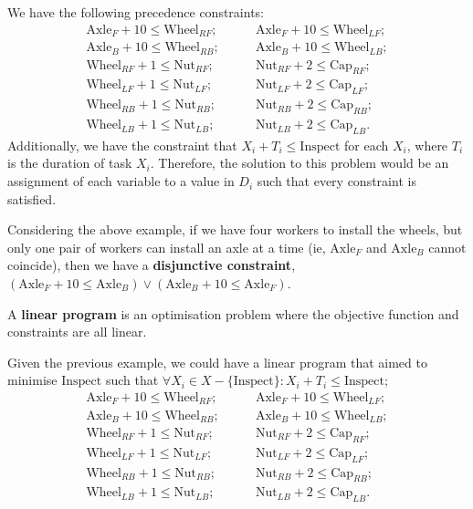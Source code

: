 \begin{example}
    We have the following precedence constraints:\\
    \begin{align*}
        \text{Axle}_{F} + 10 \le \text{Wheel}_{RF}; &\qquad \text{Axle}_{F} + 10 \le \text{Wheel}_{LF};\\
        \text{Axle}_{B} + 10 \le \text{Wheel}_{RB}; &\qquad \text{Axle}_{B} + 10 \le \text{Wheel}_{LB};\\
        \text{Wheel}_{RF} + 1 \le \text{Nut}_{RF}; &\qquad \text{Nut}_{RF} + 2 \le \text{Cap}_{RF};\\
        \text{Wheel}_{LF} + 1 \le \text{Nut}_{LF}; &\qquad \text{Nut}_{LF} + 2 \le \text{Cap}_{LF};\\
        \text{Wheel}_{RB} + 1 \le \text{Nut}_{RB}; &\qquad \text{Nut}_{RB} + 2 \le \text{Cap}_{RB};\\
        \text{Wheel}_{LB} + 1 \le \text{Nut}_{LB}; &\qquad \text{Nut}_{LB} + 2 \le \text{Cap}_{LB}.
    \end{align*}
    Additionally, we have the constraint that $X_{i} + T_{i} \le \text{Inspect}$ for each $X_{i}$, where $T_{i}$ is the duration of task $X_{i}$. Therefore, the solution to this problem would be an assignment of each variable to a value in $D_{i}$ such that every constraint is satisfied.
\end{example}

Considering the above example, if we have four workers to install the wheels, but only one pair of workers can install an axle at a time (ie, $\text{Axle}_{F}$ and $\text{Axle}_{B}$ cannot coincide), then we have a \textbf{disjunctive constraint}, $(\text{Axle}_{F} + 10 \le \text{Axle}_{B}) \lor (\text{Axle}_{B} + 10 \le \text{Axle}_{F})$.

\begin{definition}
    A \textbf{linear program} is an optimisation problem where the objective function and constraints are all linear.
\end{definition}

\begin{example}
    Given the previous example, we could have a linear program that aimed to minimise $\text{Inspect}$ such that $\forall X_{i} \in X - \{ \text{Inspect} \} : X_{i} + T_{i} \le \text{Inspect}$;
    \begin{align*}
        \text{Axle}_{F} + 10 \le \text{Wheel}_{RF}; &\qquad \text{Axle}_{F} + 10 \le \text{Wheel}_{LF};\\
        \text{Axle}_{B} + 10 \le \text{Wheel}_{RB}; &\qquad \text{Axle}_{B} + 10 \le \text{Wheel}_{LB};\\
        \text{Wheel}_{RF} + 1 \le \text{Nut}_{RF}; &\qquad \text{Nut}_{RF} + 2 \le \text{Cap}_{RF};\\
        \text{Wheel}_{LF} + 1 \le \text{Nut}_{LF}; &\qquad \text{Nut}_{LF} + 2 \le \text{Cap}_{LF};\\
        \text{Wheel}_{RB} + 1 \le \text{Nut}_{RB}; &\qquad \text{Nut}_{RB} + 2 \le \text{Cap}_{RB};\\
        \text{Wheel}_{LB} + 1 \le \text{Nut}_{LB}; &\qquad \text{Nut}_{LB} + 2 \le \text{Cap}_{LB}.
    \end{align*}
\end{example}

